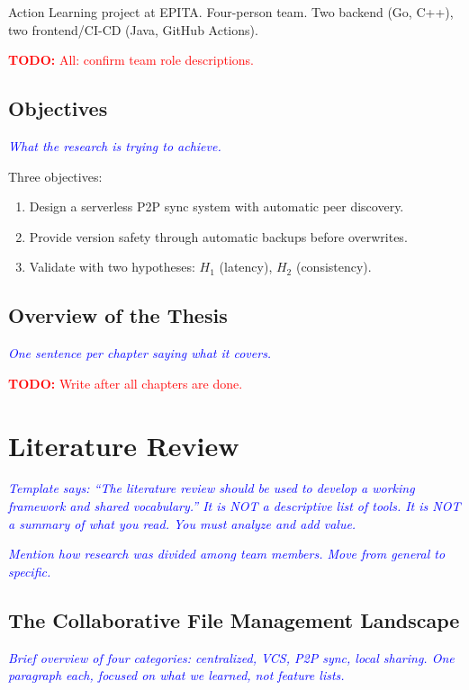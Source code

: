 \documentclass[12pt,oneside]{report}
\newcommand{\note}[1]{\textcolor{blue}{\textit{#1}}}
\newcommand{\todo}[1]{\textcolor{red}{\textbf{TODO:} #1}}
\begin{document}
Action Learning project at EPITA. Four-person team. Two backend (Go, C++), two frontend/CI-CD (Java, GitHub Actions).

\todo{All: confirm team role descriptions.}

\section{Objectives}
\note{What the research is trying to achieve.}

Three objectives:
\begin{enumerate}
    \item Design a serverless P2P sync system with automatic peer discovery.
    \item Provide version safety through automatic backups before overwrites.
    \item Validate with two hypotheses: $H_1$ (latency), $H_2$ (consistency).
\end{enumerate}

\section{Overview of the Thesis}
\note{One sentence per chapter saying what it covers.}

\todo{Write after all chapters are done.}

\chapter{Literature Review}

\note{Template says: ``The literature review should be used to develop a working framework and shared vocabulary.'' It is NOT a descriptive list of tools. It is NOT a summary of what you read. You must analyze and add value.}

\note{Mention how research was divided among team members. Move from general to specific.}

\section{The Collaborative File Management Landscape}
\note{Brief overview of four categories: centralized, VCS, P2P sync, local sharing. One paragraph each, focused on what we learned, not feature lists.}
\end{document}
